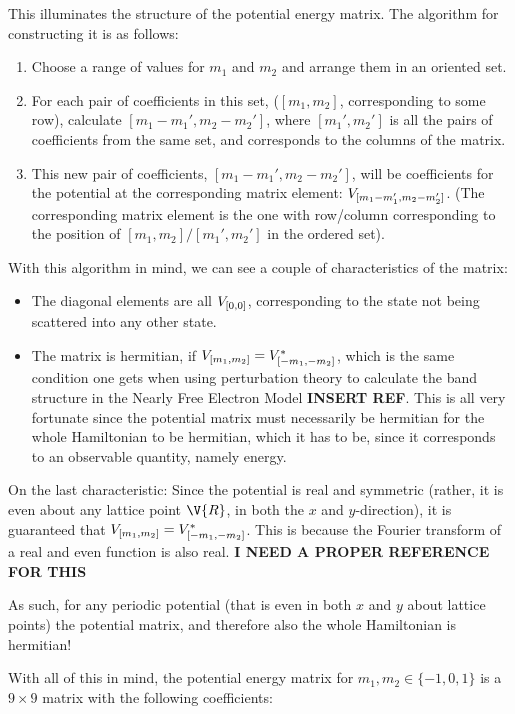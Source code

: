 \documentclass[main.tex]{subfiles}
\begin{document}
	This illuminates the structure of the potential energy matrix. The algorithm for constructing it is as follows:
	
	\begin{enumerate}
		\item Choose a range of values for $ m_1 $ and $ m_2 $ and arrange them in an oriented set.
		\item For each pair of coefficients in this set, ($ [m_1, m_2] $, corresponding to some row), calculate $ [m_1-m_1', m_2-m_2'] $, where $ [m_1', m_2'] $ is all the pairs of coefficients from the same set, and corresponds to the columns of the matrix.
		\item This new pair of coefficients, $ [m_1-m_1', m_2-m_2'] $, will be coefficients for the potential at the corresponding matrix element: $ V_{[m_1-m_1', m_2-m_2']} $. (The corresponding matrix element is the one with row/column corresponding to the position of $ [m_1, m_2]/[m_1', m_2'] $ in the ordered set). 
	\end{enumerate}
	With this algorithm in mind, we can see a couple of characteristics of the matrix:
	\begin{itemize}
		\item The diagonal elements are all $ V_{[0,0]} $, corresponding to the state not being scattered into any other state.
		\item The matrix is hermitian, if $ V_{[m_1, m_2]} = V^*_{[-m_1, -m_2]}$, which is the same condition one gets when using perturbation theory to calculate the band structure in the Nearly Free Electron Model \textbf{INSERT REF}. This is all very fortunate since the potential matrix must necessarily be hermitian for the whole Hamiltonian to be hermitian, which it has to be, since it corresponds to an observable quantity, namely energy.
	\end{itemize}
	On the last characteristic: Since the potential is real and symmetric (rather, it is even about any lattice point $ \V{R} $, in both the $ x $ and $ y $-direction), it is guaranteed that $ V_{[m_1, m_2]} = V^*_{[-m_1, -m_2]}$. This is because the Fourier transform of a real and even function is also real. \textbf{I NEED A PROPER REFERENCE FOR THIS}
	
	As such, for any periodic potential (that is even in both $ x $ and $ y $ about lattice points) the potential matrix, and therefore also the whole Hamiltonian is hermitian!
	
	With all of this in mind, the potential energy matrix for $ m_1, m_2 \in \{-1, 0, 1\} $ is a $ 9 \times 9 $ matrix with the following coefficients:
	
\end{document}
